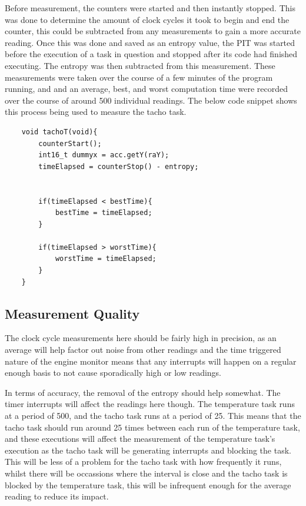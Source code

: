 \documentclass[]{report}
\begin{document}
			Before measurement, the counters were started and then instantly stopped. This was done to determine the amount of clock cycles it took to begin and end the counter, this could be subtracted from any measurements to gain a more accurate reading. Once this was done and saved as an entropy value, the PIT was started before the execution of a task in question and stopped after its code had finished executing. The entropy was then subtracted from this measurement. These measurements were taken over the course of a few minutes of the program running, and and an average, best, and worst computation time were recorded over the course of around 500 individual readings. The below code snippet shows this process being used to measure the tacho task.
			\begin{lstlisting}
	void tachoT(void){
		counterStart();
		int16_t dummyx = acc.getY(raY);
		timeElapsed = counterStop() - entropy;
			
			
		if(timeElapsed < bestTime){
			bestTime = timeElapsed;
		}
			
		if(timeElapsed > worstTime){
			worstTime = timeElapsed;
		}		
	}
			\end{lstlisting}
			
			\subsection{Measurement Quality}
			The clock cycle measurements here should be fairly high in precision, as an average will help factor out noise from other readings and the time triggered nature of the engine monitor means that any interrupts will happen on a regular enough basis to not cause sporadically high or low readings.
			\medskip
			
			In terms of accuracy, the removal of the entropy should help somewhat. The timer interrupts will affect the readings here though. The temperature task runs at a period of 500, and the tacho task runs at a period of 25. This means that the tacho task should run around 25 times between each run of the temperature task, and these executions will affect the measurement of the temperature task's execution as the tacho task will be generating interrupts and blocking the task. This will be less of a problem for the tacho task with how frequently it runs, whilst there will be occassions where the interval is close and the tacho task is blocked by the temperature task, this will be infrequent enough for the average reading to reduce its impact. 
			
\end{document}

